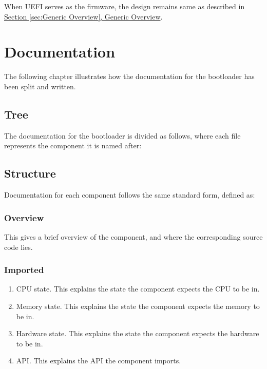 \documentclass[a4paper,oneside]{memoir}
\begin{document}
When UEFI serves as the firmware, the design remains same as described in \hyperref[sec:Generic Overview]{Section \ref*{sec:Generic Overview}, Generic Overview}.

\chapter{Documentation}

The following chapter illustrates how the documentation for the bootloader has been split and written.

\section{Tree}

The documentation for the bootloader is divided as follows, where each file represents the component it is named after:\\


\section{Structure}

Documentation for each component follows the same standard form, defined as:

\subsection{Overview}

This gives a brief overview of the component, and where the corresponding source code lies.

\subsection{Imported}

\begin{enumerate}
    \item CPU state. This explains the state the component expects the CPU to be in.
    \item Memory state. This explains the state the component expects the memory to be in.
    \item Hardware state. This explains the state the component expects the hardware to be in.
    \item API. This explains the API the component imports.
\end{enumerate}
\end{document}
